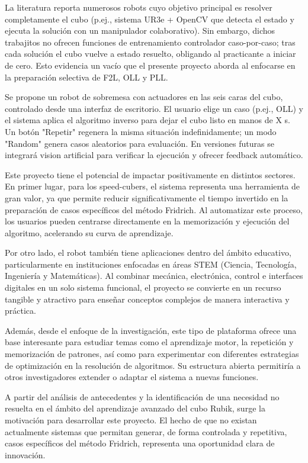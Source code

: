 La literatura reporta numerosos robots cuyo objetivo principal es resolver completamente el cubo (p.ej., sistema UR3e + OpenCV que detecta el estado y ejecuta la solución con un manipulador colaborativo\cite{Gorriz2023}). Sin embargo, dichos trabajitos no ofrecen funciones de entrenamiento controlador caso-por-caso; tras cada solución el cubo vuelve a estado resuelto, obligando al practicante a iniciar de cero. Esto evidencia un vacío que el presente proyecto aborda al enfocarse en la preparación selectiva de F2L, OLL y PLL.

Se propone un robot de sobremesa con actuadores en las seis caras del cubo, controlado desde una interfaz de escritorio. El usuario elige un caso (p.ej., OLL) y el sistema aplica el algoritmo inverso para dejar el cubo listo en manos de X s. Un botón "Repetir" regenera la misma situación indefinidamente; un modo "Random" genera casos aleatorios para evaluación. En versiones futuras se integrará vision artificial para verificar la ejecución y ofrecer feedback automático.

Este proyecto tiene el potencial de impactar positivamente en distintos sectores. En primer lugar, para los speed-cubers, el sistema representa una herramienta de gran valor, ya que permite reducir significativamente el tiempo invertido en la preparación de casos específicos del método Fridrich. Al automatizar este proceso, los usuarios pueden centrarse directamente en la memorización y ejecución del algoritmo, acelerando su curva de aprendizaje.

Por otro lado, el robot también tiene aplicaciones dentro del ámbito educativo, particularmente en instituciones enfocadas en áreas STEM (Ciencia, Tecnología, Ingeniería y Matemáticas). Al combinar mecánica, electrónica, control e interfaces digitales en un solo sistema funcional, el proyecto se convierte en un recurso tangible y atractivo para enseñar conceptos complejos de manera interactiva y práctica. 

Además, desde el enfoque de la investigación, este tipo de plataforma ofrece una base interesante para estudiar temas como el aprendizaje motor, la repetición y memorización de patrones, así como para experimentar con diferentes estrategias de optimización en la resolución de algoritmos. Su estructura abierta permitiría a otros investigadores extender o adaptar el sistema a nuevas funciones. 

A partir del análisis de antecedentes y la identificación de una necesidad no resuelta en el ámbito del aprendizaje avanzado del cubo Rubik, surge la motivación para desarrollar este proyecto. El hecho de que no existan actualmente sistemas que permitan generar, de forma controlada y repetitiva, casos específicos del método Fridrich, representa una oportunidad clara de innovación.

